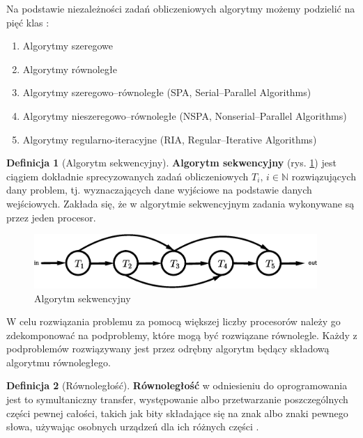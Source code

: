 \documentclass[a4paper,oneside,leqno,12pt]{book}
\theoremstyle{definition}
\newtheorem{definicja}{Definicja}[chapter]
\theoremstyle{plain}
\theoremstyle{remark}
\begin{document}
Na podstawie niezależności zadań obliczeniowych algorytmy możemy podzielić na pięć klas \cite{APC2011}:
\begin{enumerate}
\item Algorytmy szeregowe
\item Algorytmy równoległe
\item Algorytmy szeregowo--równoległe (SPA, Serial--Parallel Algorithms)
\item Algorytmy nieszeregowo--równoległe (NSPA, Nonserial--Parallel Algorithms)
\item Algorytmy regularno-iteracyjne (RIA, Regular--Iterative Algorithms)
\end{enumerate}





\begin{definicja}[Algorytm sekwencyjny]\label{def:algorytm_sekwencyjny}
\textbf{Algorytm sekwencyjny} (rys.  \ref{fig:sequential}) jest ciągiem dokładnie sprecyzowanych zadań obliczeniowych \(T_i,\, i\in\mathbb{N}\) rozwiązujących dany problem, tj. wyznaczających dane wyjściowe na podstawie danych wejściowych. Zakłada się, że w algorytmie sekwencyjnym zadania wykonywane są przez jeden procesor.
\end{definicja}

\begin{figure}[h]
\centering
\includegraphics[width=29em]{./images/Rys2.eps}
\caption{Algorytm sekwencyjny}
\label{fig:sequential}
\end{figure}

W celu rozwiązania problemu za pomocą większej liczby procesorów należy go zdekomponować na podproblemy, które mogą być rozwiązane równolegle. Każdy z podproblemów rozwiązywany jest przez odrębny algorytm będący składową algorytmu równoległego.


\begin{definicja}[Równoległość]\label{def:rownoleglosc}
\textbf{Równoległość} w odniesieniu do oprogramowania jest to symultaniczny transfer, występowanie albo przetwarzanie poszczególnych części pewnej całości, takich jak bity składające się na znak albo znaki pewnego słowa, używając osobnych urządzeń dla ich różnych części \cite{IEEE}.
\end{definicja}
\end{document}
